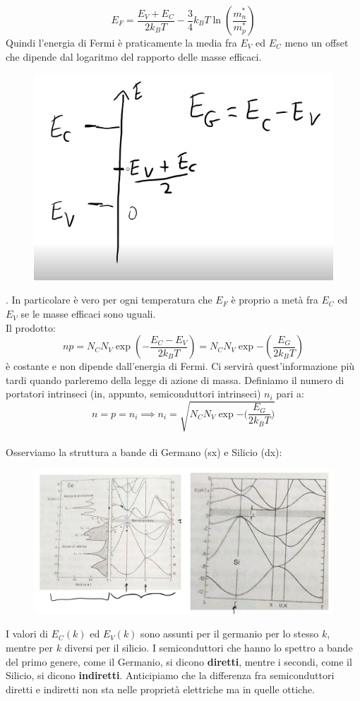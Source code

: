 \documentclass{book}
\begin{document}
        $$E_{F} = \frac{E_{V}+E_{C}}{2k_{B}T}-\frac{3}{4}k_{B}T\ln{(\frac{m_{n} ^{*}}{m_{p} ^{*}})}$$
        Quindi l'energia di Fermi è praticamente la media fra $E_{V}$ ed $E_{C}$ meno un offset che dipende dal logaritmo del rapporto delle masse efficaci.
        \begin{figure}[h!]
            \centering
            \includegraphics[width=0.5\linewidth]{img/radio5.png}
        \end{figure}.
        In particolare è vero per ogni temperatura che $E_{F}$ è proprio a metà fra $E_{C}$ ed $E_{V}$ se le masse efficaci sono uguali.\\
        Il prodotto:
        $$np = N_{C}N_{V}\exp{(-\frac{E_{C}-E_{V}}{2k_{B}T})} = N_{C}N_{V}\exp{-(\frac{E_{G}}{2k_{B}T})}$$
        è costante e non dipende dall'energia di Fermi. Ci servirà quest'informazione più tardi quando parleremo della legge di azione di massa. Definiamo il numero di portatori intrinseci (in, appunto, semiconduttori intrinseci) $n_{i}$ pari a:
        $$n=p=n_{i} \implies n_{i} = \sqrt{N_{C}N_{V}\exp{-(\frac{E_{G}}{2k_{B}T}})}$$\\
        Osserviamo la struttura a bande di Germano (sx) e Silicio (dx):\\
        \begin{figure}[h!]
            \centering
            \includegraphics[width=0.5\linewidth]{img/radio6.png}
        \end{figure}
        I valori di $E_{C}(k)$ ed $E_{V}(k)$ sono assunti per il germanio per lo stesso $k$, mentre per $k$ diversi per il silicio. I semiconduttori che hanno lo spettro a bande del primo genere, come il Germanio, si dicono \textbf{diretti}, mentre i secondi, come il Silicio, si dicono \textbf{indiretti}. Anticipiamo che la differenza fra semiconduttori diretti e indiretti non sta nelle proprietà elettriche ma in quelle ottiche.
\end{document}
